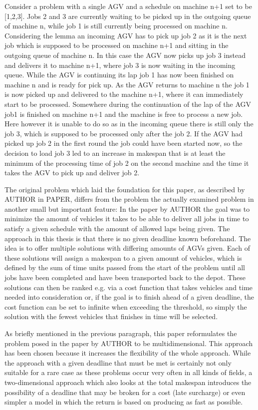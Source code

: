 Consider a problem with a single AGV and a schedule on machine n+1 set to be [1,2,3]. Jobs 2 and 3 are currently waiting to be picked up 
in the outgoing queue of machine n, while job 1 is still currently being processed on machine n. Considering the lemma an incoming AGV has to pick
up job 2 as it is the next job which is supposed to be processed on machine n+1 and sitting in the outgoing queue of machine n. In this case the 
AGV now picks up job 3 instead and delivers it to machine n+1, where job 3 is now waiting in the incoming queue. While the AGV is continuing its
lap job 1 has now been finished on machine n and is ready for pick up. As the AGV returns to machine n the job 1 is now picked up and delivered
to the machine n+1, where it can immediately start to be processed. Somewhere during the continuation of the lap of the AGV job1 is finished on
machine n+1 and the machine is free to process a new job. Here however it is unable to do so as in the incoming queue there is still only the
job 3, which is supposed to be processed only after the job 2. If the AGV had picked up job 2 in the first round the job could have been started
now, so the decision to load job 3 led to an increase in makespan that is at least the minimum of the processing time of job 2 on the second
machine and the time it takes the AGV to pick up and deliver job 2.

The original problem which laid the foundation for this paper, as described by AUTHOR in PAPER, differs from the problem the actually examined
problem in another small but important feature: In the paper by AUTHOR the goal was to minimize the amount of vehicles it takes to be able to
deliver all jobs in time to satisfy a given schedule with the amount of allowed laps being given. The approach in this thesis is that there is no
given deadline known beforehand. The idea is to offer multiple solutions with differing amounts of AGVs given. Each of these solutions will assign
a makespan to a given amount of vehicles, which is defined by the sum of time units passed from the start of the problem until all jobs have been
completed and have been transported back to the depot. These solutions can then be ranked e.g. via
a cost function that takes vehicles and time needed into consideration or, if the goal is to finish ahead of a given deadline, the cost function
can be set to infinite when exceeding the threshold, so simply the solution with the fewest vehicles that finishes in time will be selected.

As briefly mentioned in the previous paragraph, this paper reformulates the problem posed in the paper by AUTHOR to be multidimensional. This
approach has been chosen because it increases the flexibility of the whole approach. While the approach with a given deadline that must be met
is certainly not only suitable for a rare case as these problems occur very often in all kinds of fields, a two-dimensional approach which also
looks at the total makespan introduces the possibility of a deadline that may be broken for a cost (late surcharge) or even simpler a model in
which the return is based on producing as fast as possible.
